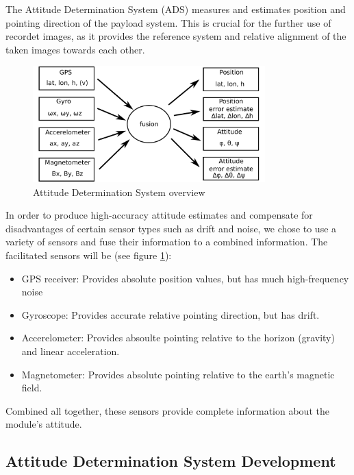 The Attitude Determination System (ADS) measures and estimates position and pointing direction of the payload system.
This is crucial for the further use of recordet images, as it provides the reference system and relative alignment of the taken images towards each other.
\begin{figure}
\centering
\includegraphics[width=0.8\textwidth]{figures/ADS_diagram.pdf}
\caption{Attitude Determination System overview}
\label{fig:ADS_overview}
\end{figure}

In order to produce high-accuracy attitude estimates and compensate for disadvantages of certain sensor types such as drift and noise, we chose to use a variety of sensors and fuse their information to a combined information.
The facilitated sensors will be (see figure \ref{fig:ADS_overview}):
\begin{itemize}
\item GPS receiver: Provides absolute position values, but has much high-frequency noise
\item Gyroscope: Provides accurate relative pointing direction, but has drift.
\item Accerelometer: Provides absoulte pointing relative to the horizon (gravity) and linear acceleration.
\item Magnetometer: Provides absolute pointing relative to the earth's magnetic field.
\end{itemize}

Combined all together, these sensors provide complete information about the module's attitude.


\subsection{Attitude Determination System Development}

